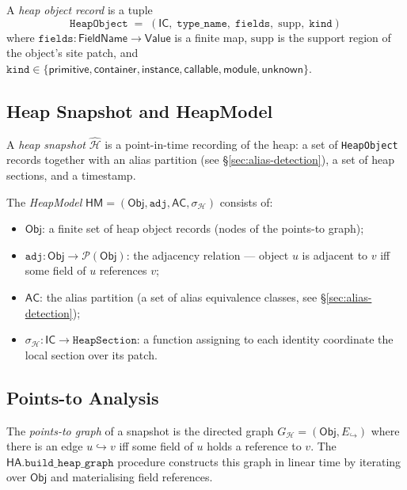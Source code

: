 \documentclass[11pt]{article}
\newcommand{\Heap}{\mathcal{H}}             %
\newcommand{\HeapObj}{\mathsf{Obj}}         %
\newcommand{\HSnap}{\widehat{\Heap}}        %
\newcommand{\ptsto}{\hookrightarrow}        %
\newcommand{\AliasCls}{\mathsf{AC}}         %
\newcommand{\HA}{\mathsf{HA}}               %
\newcommand{\HM}{\mathsf{HM}}               %
\newcommand{\IdentCoord}{\mathsf{IC}}       %
\newcommand{\suppR}{\mathrm{supp}}          %
\newcommand{\SecHeap}{\sigma_{\Heap}}       %
\begin{document}
\begin{definition}
  \label{def:heap-object}
  A \emph{heap object record} is a tuple
  \[
    \mathtt{HeapObject} \;=\; (\IdentCoord,\;\mathtt{type\_name},\;
      \mathtt{fields},\; \suppR,\; \mathtt{kind})
  \]
  where $\mathtt{fields} : \mathsf{FieldName} \to \mathsf{Value}$ is a
  finite map, $\suppR$ is the support region of the object's site patch,
  and $\mathtt{kind} \in \{\mathsf{primitive}, \mathsf{container},
  \mathsf{instance}, \mathsf{callable}, \mathsf{module},
  \mathsf{unknown}\}$.
\end{definition}

\subsection{Heap Snapshot and HeapModel}

A \emph{heap snapshot} $\HSnap$ is a point-in-time recording of the
heap: a set of \texttt{HeapObject} records together with an alias
partition (see \S\ref{sec:alias-detection}), a set of heap sections, and
a timestamp.

\begin{definition}[HeapModel]
  \label{def:heapmodel}
  The \emph{HeapModel} $\HM = (\HeapObj, \mathtt{adj}, \AliasCls,
  \SecHeap)$ consists of:
  \begin{itemize}[noitemsep]
    \item $\HeapObj$: a finite set of heap object records (nodes of the
      points-to graph);
    \item $\mathtt{adj} : \HeapObj \to \mathcal{P}(\HeapObj)$: the
      adjacency relation — object $u$ is adjacent to $v$ iff some field
      of $u$ references $v$;
    \item $\AliasCls$: the alias partition (a set of alias equivalence
      classes, see \S\ref{sec:alias-detection});
    \item $\SecHeap : \IdentCoord \to \mathtt{HeapSection}$: a
      function assigning to each identity coordinate the local section
      over its patch.
  \end{itemize}
\end{definition}

\subsection{Points-to Analysis}

The \emph{points-to graph} of a snapshot is the directed graph
$G_\Heap = (\HeapObj, E_\ptsto)$ where there is an edge
$u \ptsto v$ iff some field of $u$ holds a reference to $v$.  The
$\HA.\mathtt{build\_heap\_graph}$ procedure constructs this graph in
linear time by iterating over $\HeapObj$ and materialising field
references.
\end{document}
